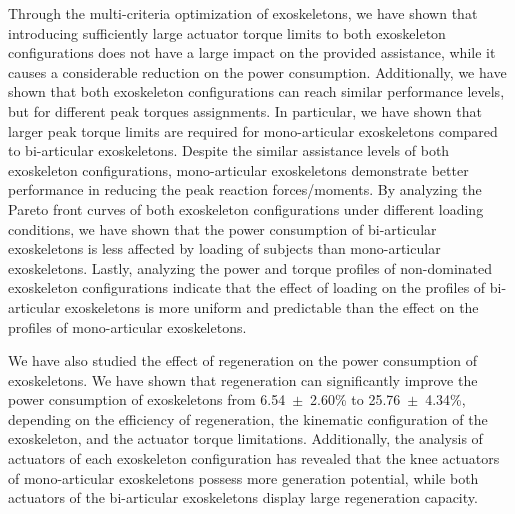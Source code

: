 \documentclass[10pt,letterpaper]{article}
\begin{document}
Through the multi-criteria optimization of exoskeletons, we have shown that introducing sufficiently large actuator torque limits to both exoskeleton configurations does not have a large impact on the provided assistance, while it causes a considerable reduction on the power consumption. Additionally, we have shown that both exoskeleton configurations can reach similar performance levels, but for different peak torques assignments. In particular, we have shown that larger peak torque limits are required for mono-articular exoskeletons compared to bi-articular exoskeletons. Despite the similar assistance levels of both exoskeleton configurations, mono-articular exoskeletons demonstrate better performance in reducing the peak reaction forces/moments. By analyzing the Pareto front curves of both exoskeleton configurations under different loading conditions, we have shown that the power consumption of bi-articular exoskeletons is less affected by loading of subjects than mono-articular exoskeletons. Lastly, analyzing the power and torque profiles of non-dominated exoskeleton configurations indicate that the effect of loading  on the profiles of bi-articular exoskeletons is more uniform and predictable than the effect on the profiles of mono-articular exoskeletons.

\bigskip
We have also studied the effect of regeneration on the power consumption of exoskeletons. We have shown that regeneration can significantly improve the power consumption of exoskeletons from 6.54~$\pm$~2.60\% to 25.76~$\pm$~4.34\%, depending on the efficiency of regeneration, the kinematic configuration of the exoskeleton, and the actuator torque limitations.  Additionally, the analysis of actuators of each exoskeleton configuration has revealed that the knee actuators of mono-articular exoskeletons possess more generation potential, while both actuators of the bi-articular exoskeletons display large regeneration capacity.
\end{document}
